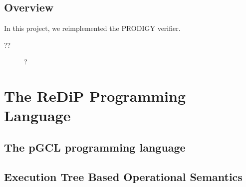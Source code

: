 \documentclass[a4paper]{article}
\begin{document}


\subsection{Overview}

In this project, we reimplemented the PRODIGY verifier.

\begin{description}
	\item[??] ?
\end{description}

\section{The ReDiP Programming Language}

\subsection{The pGCL programming language}


\subsection{Execution Tree Based Operational Semantics}
\end{document}
